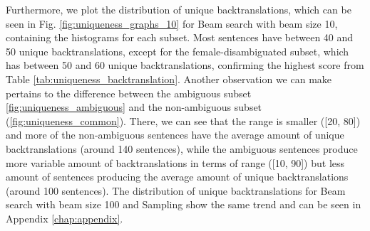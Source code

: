 Furthermore, we plot the distribution of unique backtranslations, which can be seen in Fig. \ref{fig:uniqueness_graphs_10} for Beam search with beam size 10, containing the histograms for each subset. 
Most sentences have between 40 and 50 unique backtranslations, except for the female-disambiguated subset, which has between 50 and 60 unique backtranslations, confirming the highest score from Table \ref{tab:uniqueness_backtranslation}. Another observation we can make pertains to the difference between the ambiguous subset \ref{fig:uniqueness_ambiguous} and the non-ambiguous subset (\ref{fig:uniqueness_common}). There, we can see that the range is smaller ([20, 80]) and more of the non-ambiguous sentences have the average amount of unique backtranslations (around 140 sentences), while the ambiguous sentences produce more variable amount of backtranslations in terms of range  ([10, 90]) but less amount of sentences producing the average amount of unique backtranslations (around 100 sentences).
The distribution of unique backtranslations for Beam search with beam size 100 and Sampling show the same trend and can be seen in Appendix \ref{chap:appendix}.

